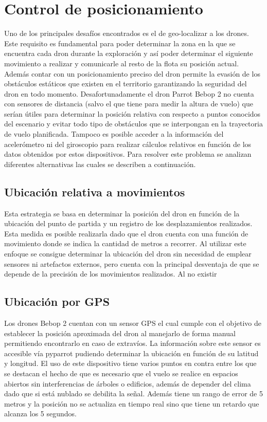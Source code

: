 \section {Control de posicionamiento}
Uno de los principales desafíos encontrados es el de geo-localizar a los drones. Este requisito es fundamental para poder determinar la zona en la que se encuentra cada dron durante la exploración y así poder determinar el siguiente movimiento a realizar y comunicarle al resto de la flota su posición actual. Además contar con un posicionamiento preciso del dron permite la evasión de los obstáculos estáticos que existen en el territorio garantizando la seguridad del dron en todo momento.
Desafortunadamente el dron Parrot Bebop 2 no cuenta con sensores de distancia (salvo el que tiene para medir la altura de vuelo) que serían útiles para determinar la posición relativa con respecto a puntos conocidos del escenario y evitar todo tipo de obstáculos que se interpongan en la trayectoria de vuelo planificada. Tampoco es posible acceder a la información del acelerómetro ni del giroscopio para realizar cálculos relativos en función de los datos obtenidos por estos dispositivos.
Para resolver este problema se analizan diferentes alternativas las cuales se describen a continuación.
\subsection {Ubicación relativa a  movimientos}
Esta estrategia se basa en determinar la posición del dron en función de la ubicación del  punto de partida y un registro de los desplazamientos realizados. Esta medida es posible realizarla dado que el dron cuenta con una función de movimiento donde se indica la cantidad de metros a recorrer.
Al utilizar este enfoque se consigue determinar la ubicación del dron sin necesidad de emplear sensores ni artefactos externos, pero cuenta con la principal desventaja de que se depende de la precisión de los movimientos realizados. Al no existir
\subsection {Ubicación por GPS}
Los drones Bebop 2 cuentan con un sensor GPS el cual cumple con el objetivo de establecer la posición aproximada del dron al manejarlo de forma manual permitiendo encontrarlo en caso de extravíos.
La información sobre este sensor es accesible vía pyparrot pudiendo determinar la ubicación en función de su latitud y longitud.
El uso de este dispositivo tiene varios puntos en contra entre los que se destacan el hecho de que es necesario que el vuelo se realice en espacios abiertos sin interferencias de árboles o edificios, además de depender del clima dado que si está nublado se debilita la señal. Además tiene un rango de error de 5 metros y la posición no se actualiza en tiempo real sino que tiene un retardo que alcanza los 5 segundos.
